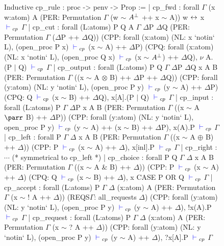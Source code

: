 \begin{figure}
\begin{coq}
Inductive cp_rule : proc -> penv -> Prop :=
  | cp_fwd : forall $\Gamma$ (x w:atom) A
             (PER: Permutation $\Gamma$ (w $\sim$ $A^\bot$ ++ x $\sim$ A))
           w ${\leftrightarrow}$ x ${\color{blue} {} \vdash {}}_{cp}$ $\Gamma$
  | cp_cut :
      forall (L:atoms) P Q A $\Gamma$ $\Delta$P $\Delta$Q
             (PER: Permutation $\Gamma$ ($\Delta$P ++ $\Delta$Q))
             (CPP: forall (x:atom) (NL: x `notin` L),
                     (open_proc P x) ${\color{blue} {} \vdash {}}_{cp}$ (x $\sim$ A) ++ $\Delta$P)
             (CPQ: forall (x:atom) (NL: x `notin` L),
                (open_proc Q x) ${\color{blue} {} \vdash {}}_{cp}$ (x $\sim$ $A^\bot$) ++ $\Delta$Q),
        $\nu$ A.(P $\mid$ Q) ${\color{blue} {} \vdash {}}_{cp}$ $\Gamma$
  | cp_output : forall (L:atoms) P Q $\Gamma$ $\Delta$P $\Delta$Q x A B
             (PER: Permutation $\Gamma$ ((x $\sim$ A $\otimes$ B) ++
                                             $\Delta$P ++ $\Delta$Q))
             (CPP: forall (y:atom) (NL: y `notin` L),
                     (open_proc P y) ${\color{blue} {} \vdash {}}_{cp}$ (y $\sim$ A) ++ $\Delta$P)
             (CPQ: Q ${\color{blue} {} \vdash {}}_{cp}$ (x $\sim$ B) ++ $\Delta$Q),
        x[A].(P $\mid$ Q) ${\color{blue} {} \vdash {}}_{cp}$ $\Gamma$
  | cp_input : forall (L:atoms) P $\Gamma$ $\Delta$P x A B
         (PER: Permutation $\Gamma$ ((x $\sim$ A $\parr$ B) ++ $\Delta$P))
         (CPP: forall (y:atom) (NL: y `notin` L),
            open_proc P y) ${\color{blue} {} \vdash {}}_{cp}$ (y $\sim$ A) ++ (x $\sim$ B) ++ $\Delta$P),
        x(A).P ${\color{blue} {} \vdash {}}_{cp}$ $\Gamma$
  | cp_left : forall P $\Gamma$ $\Delta$ x A B
            (PER: Permutation $\Gamma$ ((x $\sim$ A $\oplus$ B) ++ $\Delta$))
            (CPP: P ${\color{blue} {} \vdash {}}_{cp}$ (x $\sim$ A) ++ $\Delta$),
          x[inl].P ${\color{blue} {} \vdash {}}_{cp}$ $\Gamma$
  | cp_right : $\cdots$ (* symmetrical to cp_left *)
  | cp_choice : forall P Q $\Gamma$ $\Delta$ x A B
         (PER: Permutation $\Gamma$ ((x $\sim$ A & B) ++ $\Delta$))
         (CPP: P ${\color{blue} {} \vdash {}}_{cp}$ (x $\sim$ A) ++ $\Delta$)
         (CPQ: Q ${\color{blue} {} \vdash {}}_{cp}$ (x $\sim$ B) ++ $\Delta$),
       x CASE P OR Q ${\color{blue} {} \vdash {}}_{cp}$ $\Gamma$
  | cp_accept : forall (L:atoms) P $\Gamma$ $\Delta$ (x:atom) A
         (PER: Permutation $\Gamma$ (x $\sim$ ! A ++ $\Delta$))
         (REQS$\Gamma$: all_requests $\Delta$)
         (CPP: forall (y:atom) (NL: y `notin` L),
                 (open_proc P y) ${\color{blue} {} \vdash {}}_{cp}$ (y $\sim$ A) ++ $\Delta$),
       !x(A).P ${\color{blue} {} \vdash {}}_{cp}$ $\Gamma$
  | cp_request : forall (L:atoms) P $\Gamma$ $\Delta$ (x:atom) A
         (PER: Permutation $\Gamma$ (x $\sim$ ? A ++ $\Delta$))
         (CPP: forall (y:atom) (NL: y `notin` L),
                 (open_proc P y) ${\color{blue} {} \vdash {}}_{cp}$ (y $\sim$ A) ++ $\Delta$),
       ?x[A].P ${\color{blue} {} \vdash {}}_{cp}$ $\Gamma$

\end{coq}
\end{figure}
